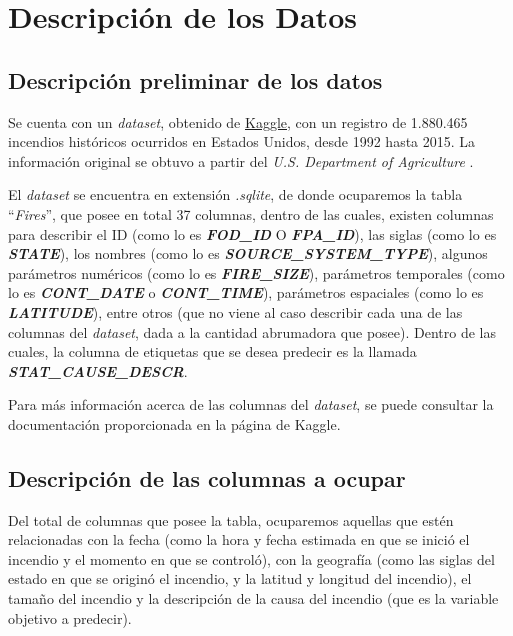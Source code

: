\section{Descripción de los Datos} \label{descr-datos}

\subsection{Descripción preliminar de los datos}

Se cuenta con un \textit{dataset}, obtenido de \href{https://www.kaggle.com/rtatman/188-million-us-wildfires}{Kaggle}, con un registro de 1.880.465 incendios históricos ocurridos en Estados Unidos, desde 1992 hasta 2015. La información original se obtuvo a partir del \textit{U.S. Department of Agriculture} \cite{FPA}.

El \textit{dataset} se encuentra en extensión \textit{.sqlite}, de donde ocuparemos la tabla ``\textit{Fires}'', que posee en total 37 columnas, dentro de las cuales, existen columnas para describir el ID (como lo es \textit{\textbf{FOD\_ID}} O \textit{\textbf{FPA\_ID}}), las siglas (como lo es \textit{\textbf{STATE}}), los nombres (como lo es \textit{\textbf{SOURCE\_SYSTEM\_TYPE}}), algunos parámetros numéricos (como lo es \textit{\textbf{FIRE\_SIZE}}), parámetros temporales (como lo es \textit{\textbf{CONT\_DATE}} o \textit{\textbf{CONT\_TIME}}), parámetros espaciales (como lo es \textit{\textbf{LATITUDE}}), entre otros (que no viene al caso describir cada una de las columnas del \textit{dataset}, dada a la cantidad abrumadora que posee). Dentro de las cuales, la columna de etiquetas que se desea predecir es la llamada \textit{\textbf{STAT\_CAUSE\_DESCR}}.

Para más información acerca de las columnas del \textit{dataset}, se puede consultar la documentación proporcionada en la página de Kaggle.

\subsection{Descripción de las columnas a ocupar}

Del total de columnas que posee la tabla, ocuparemos aquellas que estén relacionadas con la fecha (como la hora y fecha estimada en que se inició el incendio y el momento en que se controló), con la geografía (como las siglas del estado en que se originó el incendio, y la latitud y longitud del incendio), el tamaño del incendio y la descripción de la causa del incendio (que es la variable objetivo a predecir). 

